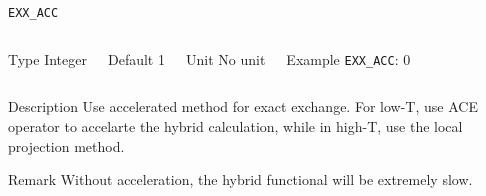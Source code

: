    \begin{frame}[allowframebreaks]{\texttt{EXX\_ACC}} \label{EXX_ACC}
    \vspace*{-12pt}
    \begin{columns}
    \begin{block}{Type}
    Integer
    \end{block}
    
    \begin{block}{Default}
    1
    \end{block}
    
    \begin{block}{Unit}
    No unit
    \end{block}
    
    \begin{block}{Example}
    \texttt{EXX\_ACC}: 0
    \end{block}
    \end{columns}
    
    \begin{block}{Description}
    Use accelerated method for exact exchange. For low-T, use ACE operator to accelarte the hybrid calculation, while in high-T, use the local projection method.
    \end{block}
    
    \begin{block}{Remark}
    Without acceleration, the hybrid functional will be extremely slow.
    \end{block}
    
    \end{frame}
    
